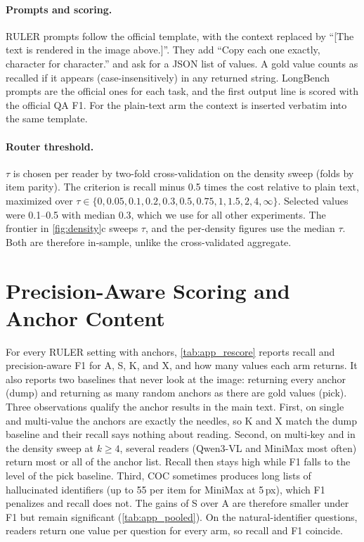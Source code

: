 \paragraph{Prompts and scoring.}
RULER prompts follow the official template, with the context replaced by ``[The text is rendered in the image above.]''.
They add ``Copy each one exactly, character for character.'' and ask for a JSON list of values.
A gold value counts as recalled if it appears (case-insensitively) in any returned string.
LongBench prompts are the official ones for each task, and the first output line is scored with the official QA F1.
For the plain-text arm the context is inserted verbatim into the same template.

\paragraph{Router threshold.}
$\tau$ is chosen per reader by two-fold cross-validation on the density sweep (folds by item parity).
The criterion is recall minus 0.5 times the cost relative to plain text, maximized over $\tau\in\{0,0.05,0.1,0.2,0.3,0.5,0.75,1,1.5,2,4,\infty\}$.
Selected values were 0.1--0.5 with median 0.3, which we use for all other experiments. The frontier in \cref{fig:density}c sweeps $\tau$, and the per-density figures use the median $\tau$.
Both are therefore in-sample, unlike the cross-validated aggregate.

\section{Precision-Aware Scoring and Anchor Content}
\label{app:rescore}

For every RULER setting with anchors, \cref{tab:app_rescore} reports recall and precision-aware F1 for A, S, K, and X, and how many values each arm returns.
It also reports two baselines that never look at the image: returning every anchor (dump) and returning as many random anchors as there are gold values (pick).
Three observations qualify the anchor results in the main text.
First, on single and multi-value the anchors are exactly the needles, so K and X match the dump baseline and their recall says nothing about reading.
Second, on multi-key and in the density sweep at $k{\ge}4$, several readers (Qwen3-VL and MiniMax most often) return most or all of the anchor list.
Recall then stays high while F1 falls to the level of the pick baseline.
Third, COC sometimes produces long lists of hallucinated identifiers (up to 55 per item for MiniMax at 5\,px), which F1 penalizes and recall does not.
The gains of S over A are therefore smaller under F1 but remain significant (\cref{tab:app_pooled}).
On the natural-identifier questions, readers return one value per question for every arm, so recall and F1 coincide.

